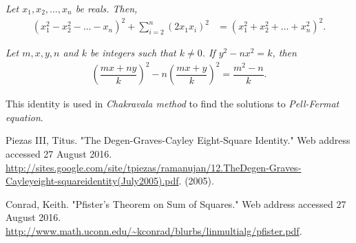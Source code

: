 	\begin{identity}\slshape\label{id:euleraida}
		Let $x_1,x_2,\dots,x_n$ be reals. Then,
		\begin{align*}
			(x_1^2-x_2^2-\dots-x_n)^2 + \sum_{i=2}^{n}(2x_1x_i)^2 & = (x_1^2+x_2^2+\dots+x_n^2)^2.
		\end{align*}
	\end{identity}
	
	\begin{identity}\slshape
		Let $m,x,y,n$ and $k$ be integers such that $k \neq 0$. If $y^2-nx^2=k$, then
		\begin{align*}
			\left( \dfrac{mx+ny}{k}\right) ^2-n\left( \dfrac{mx+y}{k}\right)^2= \dfrac{m^2-n}{k}.
		\end{align*}
	\end{identity}
	This identity is used in {\it Chakravala method} to find the solutions to {\it Pell-Fermat equation}.
	
	\begin{thebibliography}{99}
		 Piezas III, Titus. "The Degen-Graves-Cayley Eight-Square Identity." Web address accessed 27 August 2016. \url{http://sites.google.com/site/tpiezas/ramanujan/12.TheDegen-Graves-Cayleyeight-squareidentity(July2005).pdf}. (2005).
		
		 Conrad, Keith. "Pfister's Theorem on Sum of Squares." Web address accessed 27 August 2016. \url{http://www.math.uconn.edu/~kconrad/blurbs/linmultialg/pfister.pdf}.
		
	\end{thebibliography}
	
	
